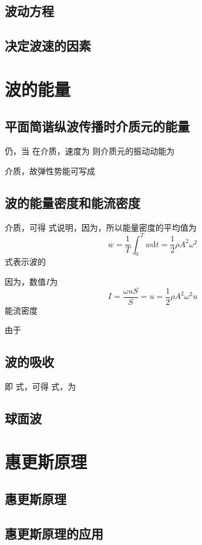     \subsection{波动方程}
    \subsection{决定波速的因素}

\section{波的能量}
    \subsection{平面简谐纵波传播时介质元的能量}
    仍，当
    在介质，速度为
    则介质元的振动动能为

    介质，故弹性势能可写成
    \subsection{波的能量密度和能流密度}
    介质，可得
    式说明，因为，所以能量密度的平均值为
    \[
    \overline{w}=\frac{1}{T}\int^T_0 w\mathrm{d}t=\frac{1}{2}\rho A^2 \omega^2
    \]
    式表示波的

    因为，数值$I$为
    \[
    I=\frac{\omega uS}{S}=u=\frac{1}{2}\rho A^2\omega^2 u
    \]
    能流密度

    由于
    \subsection{波的吸收}
    即
    式，可得
    式，为
    \subsection{球面波}

\section{惠更斯原理}
    \subsection{惠更斯原理}
    \subsection{惠更斯原理的应用}

